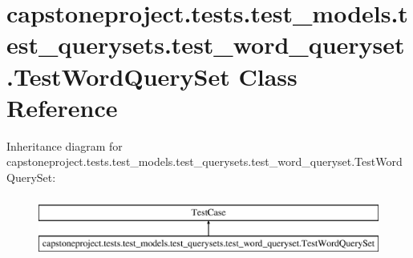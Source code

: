 \hypertarget{classcapstoneproject_1_1tests_1_1test__models_1_1test__querysets_1_1test__word__queryset_1_1_test_word_query_set}{}\section{capstoneproject.\+tests.\+test\+\_\+models.\+test\+\_\+querysets.\+test\+\_\+word\+\_\+queryset.\+Test\+Word\+Query\+Set Class Reference}
\label{classcapstoneproject_1_1tests_1_1test__models_1_1test__querysets_1_1test__word__queryset_1_1_test_word_query_set}
Inheritance diagram for capstoneproject.\+tests.\+test\+\_\+models.\+test\+\_\+querysets.\+test\+\_\+word\+\_\+queryset.\+Test\+Word\+Query\+Set\+:\begin{figure}[H]
\begin{center}
\leavevmode
\includegraphics[height=2.000000cm]{classcapstoneproject_1_1tests_1_1test__models_1_1test__querysets_1_1test__word__queryset_1_1_test_word_query_set}
\end{center}
\end{figure}
